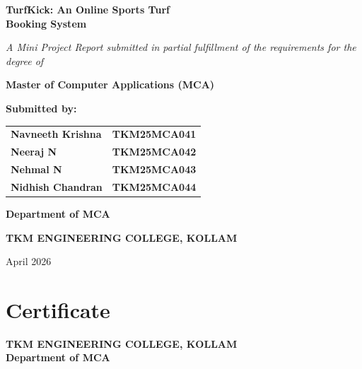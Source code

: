 \documentclass[12pt,a4paper]{report}
\begin{document}

\begin{titlepage}
    \centering
    \vspace*{0.5in}
    {\Huge \bfseries TurfKick: An Online Sports Turf \\ Booking System \par}
    \vspace{0.4in}
    {\Large \itshape A Mini Project Report submitted in partial fulfillment of the requirements for the degree of \par}
    \vspace{0.2in}
    {\Large \bfseries Master of Computer Applications (MCA) \par}
    \vspace{0.5in}
    
    {\large \bfseries Submitted by: \par}
    \vspace{0.2in}
    \begin{table}[h]
        \centering
        \begin{tabular}{ll}
            \textbf{Navneeth Krishna} & \textbf{TKM25MCA041} \\
            \textbf{Neeraj N} & \textbf{TKM25MCA042} \\
            \textbf{Nehmal N} & \textbf{TKM25MCA043} \\
            \textbf{Nidhish Chandran} & \textbf{TKM25MCA044} \\
        \end{tabular}
    \end{table}

    \vfill
    \vspace{0.2in}
    {\large \bfseries Department of MCA \par}
    {\large \bfseries TKM ENGINEERING COLLEGE, KOLLAM \par}
    {\large April 2026 \par}
\end{titlepage}

\chapter*{Certificate}
\centering
\textbf{TKM ENGINEERING COLLEGE, KOLLAM \\ Department of MCA}
\vspace{0.5in}
\end{document}
